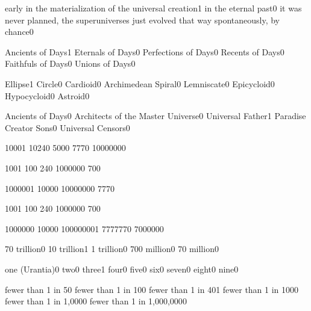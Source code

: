 
{early in the materialization of the universal creation}{1}
{in the eternal past}{0}
{it was never planned, the superuniverses just evolved that way spontaneously, by chance}{0}
\qstop

{Ancients of Days}{1}
{Eternals of Days}{0}
{Perfections of Days}{0}
{Recents of Days}{0}
{Faithfuls of Days}{0}
{Unions of Days}{0}
\qstop

{Ellipse}{1}
{Circle}{0}
{Cardioid}{0}
{Archimedean Spiral}{0}
{Lemniscate}{0}
{Epicycloid}{0}
{Hypocycloid}{0}
{Astroid}{0}
\qstop

{Ancients of Days}{0}
{Architects of the Master Universe}{0}
{Universal Father}{1}
{Paradise Creator Sons}{0}
{Universal Censors}{0}
\qstop


{1000}{1}
{1024}{0}
{500}{0}
{777}{0}
{1000000}{0}
\qstop

{100}{1}
{10}{0}
{24}{0}
{100000}{0}
{70}{0}
\qstop

{100000}{1}
{1000}{0}
{1000000}{0}
{777}{0}
\qstop

{100}{1}
{10}{0}
{24}{0}
{100000}{0}
{70}{0}
\qstop

{100000}{0}
{1000}{0}
{10000000}{1}
{777777}{0}
{700000}{0}
\qstop

{70 trillion}{0}
{10 trillion}{1}
{1 trillion}{0}
{700 million}{0}
{70 million}{0}
\qstop

{one (Urantia)}{0}
{two}{0}
{three}{1}
{four}{0}
{five}{0}
{six}{0}
{seven}{0}
{eight}{0}
{nine}{0}
\qstop

{fewer than 1 in 5}{0}
{fewer than 1 in 10}{0}
{fewer than 1 in 40}{1}
{fewer than 1 in 100}{0}
{fewer than 1 in 1,000}{0}
{fewer than 1 in 1,000,000}{0}
\qstop

